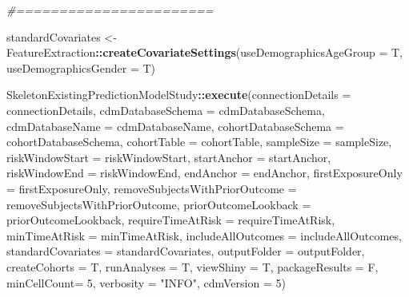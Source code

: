 \documentclass[
]{article}
\newenvironment{Shaded}{\begin{snugshade}}{\end{snugshade}}
\newcommand{\CommentTok}[1]{\textcolor[rgb]{0.56,0.35,0.01}{\textit{#1}}}
\newcommand{\DataTypeTok}[1]{\textcolor[rgb]{0.13,0.29,0.53}{#1}}
\newcommand{\DecValTok}[1]{\textcolor[rgb]{0.00,0.00,0.81}{#1}}
\newcommand{\KeywordTok}[1]{\textcolor[rgb]{0.13,0.29,0.53}{\textbf{#1}}}
\newcommand{\NormalTok}[1]{#1}
\newcommand{\OperatorTok}[1]{\textcolor[rgb]{0.81,0.36,0.00}{\textbf{#1}}}
\newcommand{\StringTok}[1]{\textcolor[rgb]{0.31,0.60,0.02}{#1}}
\begin{document}
\begin{Shaded}
\begin{Highlighting}[]
\CommentTok{#=======================}

\NormalTok{standardCovariates <-}\StringTok{ }\NormalTok{FeatureExtraction}\OperatorTok{::}\KeywordTok{createCovariateSettings}\NormalTok{(}\DataTypeTok{useDemographicsAgeGroup =}\NormalTok{ T, }\DataTypeTok{useDemographicsGender =}\NormalTok{ T)}

\NormalTok{SkeletonExistingPredictionModelStudy}\OperatorTok{::}\KeywordTok{execute}\NormalTok{(}\DataTypeTok{connectionDetails =}\NormalTok{ connectionDetails,}
                                    \DataTypeTok{cdmDatabaseSchema =}\NormalTok{ cdmDatabaseSchema,}
                                    \DataTypeTok{cdmDatabaseName =}\NormalTok{ cdmDatabaseName,}
                                    \DataTypeTok{cohortDatabaseSchema =}\NormalTok{ cohortDatabaseSchema,}
                                    \DataTypeTok{cohortTable =}\NormalTok{ cohortTable,}
                                    \DataTypeTok{sampleSize =}\NormalTok{ sampleSize,}
                                    \DataTypeTok{riskWindowStart =}\NormalTok{ riskWindowStart,}
                                    \DataTypeTok{startAnchor =}\NormalTok{ startAnchor,}
                                    \DataTypeTok{riskWindowEnd =}\NormalTok{ riskWindowEnd,}
                                    \DataTypeTok{endAnchor =}\NormalTok{ endAnchor,}
                                    \DataTypeTok{firstExposureOnly =}\NormalTok{ firstExposureOnly,}
                                    \DataTypeTok{removeSubjectsWithPriorOutcome =}\NormalTok{ removeSubjectsWithPriorOutcome,}
                                    \DataTypeTok{priorOutcomeLookback =}\NormalTok{ priorOutcomeLookback,}
                                    \DataTypeTok{requireTimeAtRisk =}\NormalTok{ requireTimeAtRisk,}
                                    \DataTypeTok{minTimeAtRisk =}\NormalTok{ minTimeAtRisk,}
                                    \DataTypeTok{includeAllOutcomes =}\NormalTok{ includeAllOutcomes,}
                                    \DataTypeTok{standardCovariates =}\NormalTok{ standardCovariates,}
                                    \DataTypeTok{outputFolder =}\NormalTok{ outputFolder,}
                                    \DataTypeTok{createCohorts =}\NormalTok{ T,}
                                    \DataTypeTok{runAnalyses =}\NormalTok{ T,}
                                    \DataTypeTok{viewShiny =}\NormalTok{ T,}
                                    \DataTypeTok{packageResults =}\NormalTok{ F,}
                                    \DataTypeTok{minCellCount=} \DecValTok{5}\NormalTok{,}
                                    \DataTypeTok{verbosity =} \StringTok{"INFO"}\NormalTok{,}
                                    \DataTypeTok{cdmVersion =} \DecValTok{5}\NormalTok{)}
\end{Highlighting}
\end{Shaded}
\end{document}
